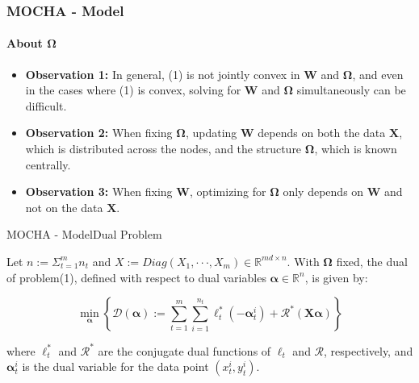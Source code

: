 \documentclass[UTF8,aspectratio=169,presentation]{ctexbeamer}
\begin{document}
  \begin{frame}[t]
    \frametitle{MOCHA - Model}
    \framesubtitle{About $\boldsymbol\Omega$}
    \begin{itemize}
      \item \textbf{ Observation 1: } In general, (1) is not jointly convex in $\mathbf W$ and $\boldsymbol\Omega$, and even in the cases where (1) is convex, solving for $\mathbf W$ and $\boldsymbol\Omega$ simultaneously can be difficult.
     \item \textbf{ Observation 2: } When fixing $\boldsymbol\Omega$, updating $\mathbf W$ depends on both the data $\mathbf X$, which is distributed across the nodes, and the structure $\boldsymbol \Omega$, which is known centrally.
    \item \textbf{ Observation 3: } When fixing $\mathbf W$, optimizing for $\boldsymbol\Omega$ only depends on $\mathbf W$ and not on the data $\mathbf X$.
  \end{itemize}
  
\end{frame}

  \newcommand{\eqtwo}{
  \min _{\boldsymbol\alpha}\left\{\mathcal{D}(\boldsymbol{\alpha}):=\sum_{t=1}^{m} \sum_{i=1}^{n_{t}} \ell_{t}^{*}\left(-\boldsymbol{\alpha}_{t}^{i}\right)+\mathcal{R}^{*}(\mathbf{X} \boldsymbol{\alpha})\right\}
  }
\begin{frame}[t]{MOCHA - Model}{Dual Problem}

  Let $n:=\Sigma^m_{t=1} n_t $ and $X := Diag(X_1,···,X_m) \in \mathbb{R}^{md\times n}$.  With $\boldsymbol\Omega$ fixed, the dual of problem(1), defined with respect to dual variables $\boldsymbol\alpha \in \mathbb R^n$, is given by:

  $$
  \eqtwo
  $$

  where $\ell^*_t$ and $\mathcal R^*$ are the conjugate dual functions of $\ell_t$ and $\mathcal{R}$, respectively, and $\boldsymbol\alpha^i_t$ is the dual variable for the data point $(x^i_t,y^i_t)$.
\end{frame}
\end{document}
